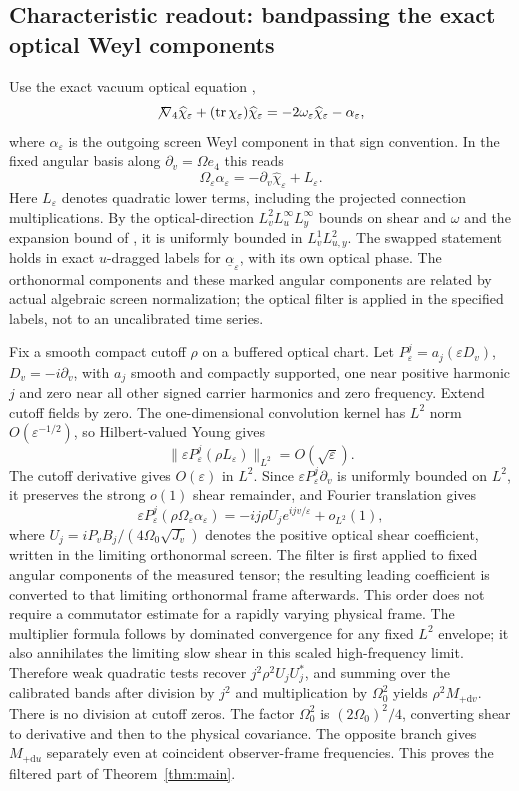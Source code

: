 \documentclass[11pt]{article}
\newcommand{\eps}{\varepsilon}
\newcommand{\Tr}{\operatorname{tr}}
\newcommand{\dd}{\mathrm d}
\begin{document}
\subsection{Characteristic readout: bandpassing the exact optical Weyl components}\label{sec:filter}
Use the exact vacuum optical equation \cite[(22)]{LRimp},
\[
 \not\nabla_4\widehat\chi_\eps+
   (\Tr\chi_\eps)\widehat\chi_\eps
 =-2\omega_\eps\widehat\chi_\eps-\alpha_\eps ,
\]
where $\alpha_\eps$ is the outgoing screen Weyl component in that sign convention. In the fixed angular basis along $\partial_v=\Omega e_4$ this reads
\[
 \Omega_\eps\alpha_\eps=-\partial_v\widehat\chi_\eps+L_\eps.
\]
Here $L_\eps$ denotes quadratic lower terms, including the projected connection multiplications. By the optical-direction $L^2_v L^\infty_u L^\infty_y$ bounds on shear and $\omega$ and the expansion bound of \cite[Def.~2.26]{LR}, it is uniformly bounded in $L^1_v L^2_{u,y}$. The swapped statement holds in exact $u$-dragged labels for $\underline\alpha_\eps$, with its own optical phase. The orthonormal components and these marked angular components are related by actual algebraic screen normalization; the optical filter is applied in the specified labels, not to an uncalibrated time series.

Fix a smooth compact cutoff $\rho$ on a buffered optical chart. Let $P_\eps^j=a_j(\eps D_v)$, $D_v=-i\partial_v$, with $a_j$ smooth and compactly supported, one near positive harmonic $j$ and zero near all other signed carrier harmonics and zero frequency. Extend cutoff fields by zero. The one-dimensional convolution kernel has $L^2$ norm $O(\eps^{-1/2})$, so Hilbert-valued Young gives
\[
 \|\eps P_\eps^j(\rho L_\eps)\|_{L^2}=O(\sqrt{\eps}).
\]
The cutoff derivative gives $O(\eps)$ in $L^2$. Since $\eps P_\eps^j\partial_v$ is uniformly bounded on $L^2$, it preserves the strong $o(1)$ shear remainder, and Fourier translation gives
\[
 \eps P_\eps^j(\rho\Omega_\eps\alpha_\eps)
       =-ij\rho U_j e^{ijv/\eps}+o_{L^2}(1),
\]
where $U_j=iP_v B_j/(4\Omega_0\sqrt{J_v})$ denotes the positive optical shear coefficient, written in the limiting orthonormal screen. The filter is first applied to fixed angular components of the measured tensor; the resulting leading coefficient is converted to that limiting orthonormal frame afterwards. This order does not require a commutator estimate for a rapidly varying physical frame. The multiplier formula follows by dominated convergence for any fixed $L^2$ envelope; it also annihilates the limiting slow shear in this scaled high-frequency limit. Therefore weak quadratic tests recover $j^2\rho^2 U_jU_j^*$, and summing over the calibrated bands after division by $j^2$ and multiplication by $\Omega_0^2$ yields $\rho^2 M_{+\dd v}$. There is no division at cutoff zeros. The factor $\Omega_0^2$ is $(2\Omega_0)^2/4$, converting shear to derivative and then to the physical covariance. The opposite branch gives $M_{+\dd u}$ separately even at coincident observer-frame frequencies. This proves the filtered part of Theorem~\ref{thm:main}.
\end{document}
